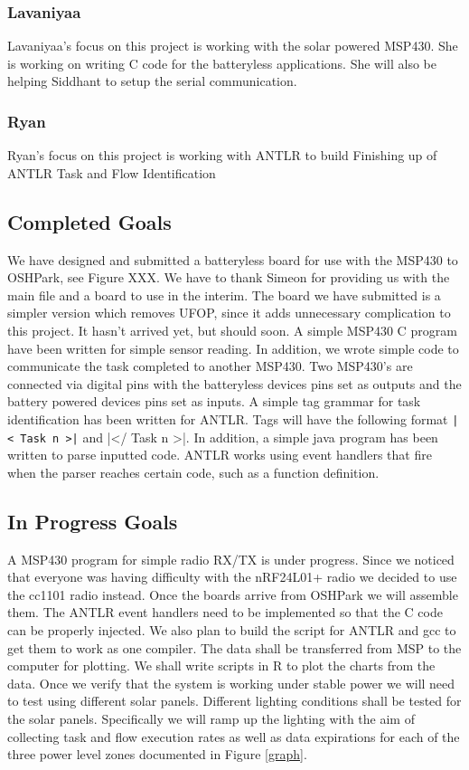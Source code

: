 \subsubsection{Lavaniyaa}
Lavaniyaa's focus on this project is working with the solar powered MSP430.
She is working on writing C code for the batteryless applications.
She will also be helping Siddhant to setup the serial communication.

\subsubsection{Ryan}
Ryan's focus on this project is working with ANTLR to build
Finishing up of ANTLR Task and Flow Identification

\subsection{Completed Goals}

We have designed and submitted a batteryless board for use with the MSP430 to OSHPark, see Figure XXX.
We have to thank Simeon for providing us with the main file and a board to use in the interim.
The board we have submitted is a simpler version which removes UFOP, since it adds unnecessary complication to this project.
It hasn't arrived yet, but should soon.
A simple MSP430 C program have been written for simple sensor reading.
In addition, we wrote simple code to communicate the task completed to another MSP430.
Two MSP430's are connected via digital pins with the batteryless devices pins set as outputs and the battery powered devices pins set as inputs.
A simple tag grammar for task identification has been written for ANTLR.
Tags will have the following format {\tt |< Task n >|} and |</ Task n >|.
In addition, a simple java program has been written to parse inputted code.
ANTLR works using event handlers that fire when the parser reaches certain code, such as a function definition.

\subsection{In Progress Goals}

A MSP430 program for simple radio RX/TX is under progress.
Since we noticed that everyone was having difficulty with the nRF24L01+ radio we decided to use the cc1101 radio instead.
Once the boards arrive from OSHPark we will assemble them.
The ANTLR event handlers need to be implemented so that the C code can be properly injected.
We also plan to build the script for ANTLR and gcc to get them to work as one compiler.
The data shall be transferred from MSP to the computer for plotting.
We shall write scripts in R to plot the charts from the data.
Once we verify that the system is working under stable power we will need to test using different solar panels.
Different lighting conditions shall be tested for the solar panels.
Specifically we will ramp up the lighting with the aim of collecting task and flow execution rates as well as data expirations for each of the three power level zones documented in Figure \ref{graph}.


